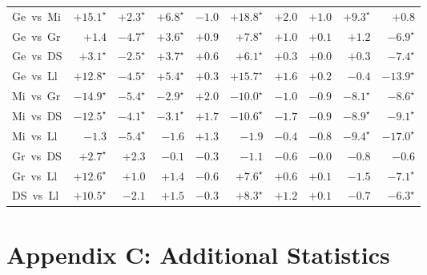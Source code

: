 \documentclass[11pt,letterpaper]{article}
\begin{document}
\begin{landscape}
\begin{table}[H]
{\begin{tabular}{lrrrrrrrrr}
Ge~vs~Mi & $+15.1^\star$ & $+2.3^\star$ & $+6.8^\star$ & $-1.0$ & $+18.8^\star$ & $+2.0$ & $+1.0$ & $+9.3^\star$ & $+0.8$ \\
Ge~vs~Gr & $+1.4$ & $-4.7^\star$ & $+3.6^\star$ & $+0.9$ & $+7.8^\star$ & $+1.0$ & $+0.1$ & $+1.2$ & $-6.9^\star$ \\
Ge~vs~DS & $+3.1^\star$ & $-2.5^\star$ & $+3.7^\star$ & $+0.6$ & $+6.1^\star$ & $+0.3$ & $+0.0$ & $+0.3$ & $-7.4^\star$ \\
Ge~vs~Ll & $+12.8^\star$ & $-4.5^\star$ & $+5.4^\star$ & $+0.3$ & $+15.7^\star$ & $+1.6$ & $+0.2$ & $-0.4$ & $-13.9^\star$ \\
Mi~vs~Gr & $-14.9^\star$ & $-5.4^\star$ & $-2.9^\star$ & $+2.0$ & $-10.0^\star$ & $-1.0$ & $-0.9$ & $-8.1^\star$ & $-8.6^\star$ \\
Mi~vs~DS & $-12.5^\star$ & $-4.1^\star$ & $-3.1^\star$ & $+1.7$ & $-10.6^\star$ & $-1.7$ & $-0.9$ & $-8.9^\star$ & $-9.1^\star$ \\
Mi~vs~Ll & $-1.3$ & $-5.4^\star$ & $-1.6$ & $+1.3$ & $-1.9$ & $-0.4$ & $-0.8$ & $-9.4^\star$ & $-17.0^\star$ \\
Gr~vs~DS & $+2.7^\star$ & $+2.3$ & $-0.1$ & $-0.3$ & $-1.1$ & $-0.6$ & $-0.0$ & $-0.8$ & $-0.6$ \\
Gr~vs~Ll & $+12.6^\star$ & $+1.0$ & $+1.4$ & $-0.6$ & $+7.6^\star$ & $+0.6$ & $+0.1$ & $-1.5$ & $-7.1^\star$ \\
DS~vs~Ll & $+10.5^\star$ & $-2.1$ & $+1.5$ & $-0.3$ & $+8.3^\star$ & $+1.2$ & $+0.1$ & $-0.7$ & $-6.3^\star$ \\
\bottomrule
\end{tabular}%
}
\end{table}


\section*{Appendix C: Additional Statistics}


\end{landscape}
\end{document}

